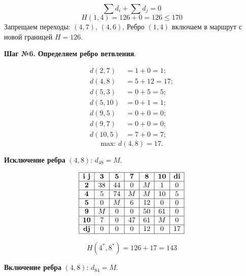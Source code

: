\documentclass[17pt]{extarticle}
\begin{document}
\[ \sum d_i + \sum d_j = 0 \]
\[ H(1,4) = 126 + 0 = 126 \leq 170 \]
Запрещаем переходы: \((4,7)\), \((4,6)\),
Ребро \((1,4)\) включаем в маршрут с новой границей \( H = 126 \).

\textbf{Шаг №6.}
\textbf{Определяем ребро ветвления}.

\[
    \begin{aligned}
        d(2,7)  & = 1 + 0 = 1;   \\
        d(4,8)  & = 5 + 12 = 17; \\
        d(5,3)  & = 0 + 5 = 5;   \\
        d(5,10) & = 0 + 1 = 1;   \\
        d(9,5)  & = 0 + 0 = 0;   \\
        d(9,7)  & = 0 + 0 = 0;   \\
        d(10,5) & = 7 + 0 = 7;
    \end{aligned}
\]
\[ \text{max: } d(4,8) = 17. \]

\textbf{Исключение ребра} \((4,8)\): \( d_{48} = M \).

\[
    \begin{array}{|c|c|c|c|c|c|c|}
        \hline
        \textbf{i j} & \textbf{3} & \textbf{5} & \textbf{7} & \textbf{8} & \textbf{10} & \textbf{di} \\
        \hline
        \textbf{2}   & 38         & 44         & 0          & M          & 1           & 0           \\
        \hline
        \textbf{4}   & 5          & 74         & M          & M          & 10          & 5           \\
        \hline
        \textbf{5}   & 0          & M          & 6          & 12         & 0           & 0           \\
        \hline
        \textbf{9}   & M          & 0          & 0          & 50         & 61          & 0           \\
        \hline
        \textbf{10}  & 7          & 0          & 47         & 61         & M           & 0           \\
        \hline
        \textbf{dj}  & 0          & 0          & 0          & 12         & 0           & 17          \\
        \hline
    \end{array}
\]

\[ H(4^*,8^*) = 126 + 17 = 143 \]

\textbf{Включение ребра} \((4,8)\): \( d_{84} = M \).
\end{document}
